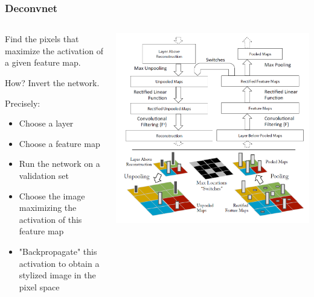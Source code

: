 \begin{frame}
	\frametitle{Deconvnet}
	
		
	\begin{columns} %
		\begin{column}{.4\textwidth}
		Find the pixels that maximize the activation of a given feature map.
			 
		\bigskip 
		
		How? Invert the network.
		
		\bigskip 
		
		Precisely: 
		\begin{itemize}
			\item Choose a layer
			\item Choose a feature map
			\item Run the network on a validation set
			\item Choose the image maximizing the activation of this feature map
			\item "Backpropagate" this activation to obtain a stylized image in the pixel space
		\end{itemize}	
		\end{column}%

		\begin{column}{.6\textwidth}
			\hspace{-1.5cm}
			\begin{center}
				\includegraphics[scale=0.6]{figs/deconvnet}
			\end{center}
		\end{column}%
	\end{columns}
	
	
 
	
	
	
\end{frame}

